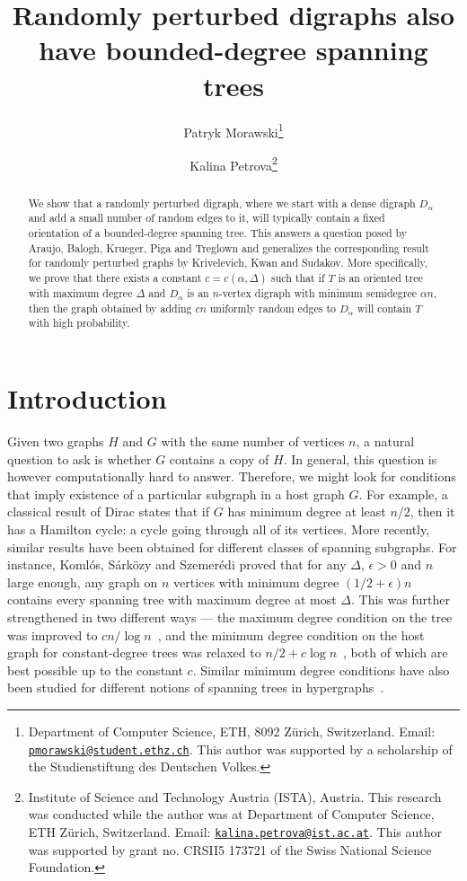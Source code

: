 \documentclass[10pt, a4paper]{article}
\title{Randomly perturbed digraphs also have bounded-degree spanning trees}
\author{
Patryk Morawski\thanks{Department of Computer Science, ETH, 8092 Z\"urich, Switzerland.
			Email: \href{mailto:pmorawski@student.ethz.ch}{\nolinkurl{pmorawski@student.ethz.ch}}. This author was supported by a scholarship of the Studienstiftung des Deutschen Volkes.}
\and Kalina Petrova\thanks{Institute of Science and Technology Austria (ISTA), Austria. This research was conducted while the author was at Department of Computer Science, ETH Z\"urich, Switzerland.
			Email: \href{mailto:kalina.petrova@inf.ethz.ch}{\nolinkurl{kalina.petrova@ist.ac.at}}. This author was supported by grant no. CRSII5 173721 of the Swiss National Science Foundation.}}
\date{}
\theoremstyle{remark}
\begin{document}
\maketitle
\begin{abstract}
    We show that a randomly perturbed digraph, where we start with a dense digraph $D_{\alpha}$ and add a small number of random edges to it, will typically contain a fixed orientation of a bounded-degree spanning tree.
    This answers a question posed by Araujo, Balogh, Krueger, Piga and Treglown and generalizes the corresponding result for randomly perturbed graphs by Krivelevich, Kwan and Sudakov.
    More specifically, we prove that there exists a constant $c = c(\alpha, \Delta)$ such that if $T$ is an oriented tree with maximum degree $\Delta$ and $D_\alpha$ is an $n$-vertex digraph  with minimum semidegree $\alpha n$, then the graph obtained by adding $cn$ uniformly random edges to $D_\alpha$ will contain $T$ with high probability.
\end{abstract}

\section[short]{Introduction}
Given two graphs $H$ and $G$ with the same number of vertices $n$, a natural question to ask is whether $G$ contains a copy of $H$.
In general, this question is however computationally hard to answer.
Therefore, we might look for conditions that imply existence of a particular subgraph in a host graph $G$.
For example, a classical result of Dirac \cite{dirac} states that if $G$ has minimum degree at least $n/2$, then it has a Hamilton cycle: a cycle going through all of its vertices.
More recently, similar results have been obtained for different classes of spanning subgraphs.
For instance, Komlós, Sárközy and Szemerédi \cite{komlós_sárközy_szemerédi} proved that for any $\Delta$, $\epsilon > 0$ and $n$ large enough, any graph on $n$ vertices with minimum degree $(1/2 + \epsilon)n$ contains every spanning tree with maximum degree at most $\Delta$. This was further strengthened in two different ways --- the maximum degree condition on the tree was improved to $c n/\log n$~\cite{kss2001}, and the minimum degree condition on the host graph for constant-degree trees was relaxed to $n/2+c\log n$~\cite{csaba2010}, both of which are best possible up to the constant $c$. Similar minimum degree conditions have also been studied for different notions of spanning trees in hypergraphs~\cite{pavez-signe_dirac-type_2021,pehova2023minimum}.
\end{document}
